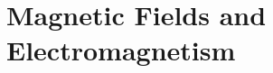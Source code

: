 \documentclass[../em.tex]{subfiles}
\begin{document}
\chapter{Magnetic Fields and Electromagnetism}
\end{document}
